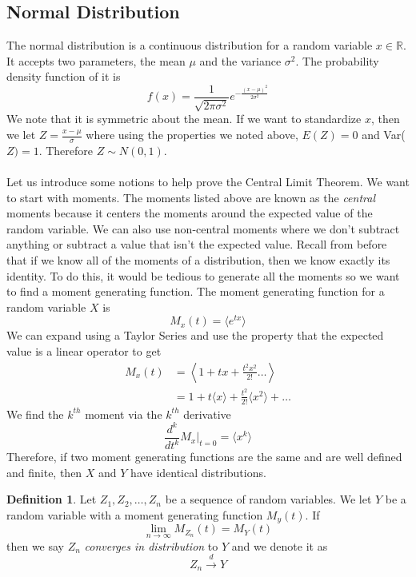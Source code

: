 \documentclass{article}
\theoremstyle{definition}
\newtheorem{definition}[theorem]{Definition}
\begin{document}
\subsection{Normal Distribution}
The normal distribution is a continuous distribution for a random variable $x\in \mathbb{R}$. It accepts two parameters, the mean $\mu$ and the variance $\sigma^2$. The probability density function of it is 
\begin{equation*}
    f(x) = \frac{1}{\sqrt{2\pi \sigma^2}} e^{-\frac{(x-\mu)^2}{2\sigma^2}}
\end{equation*}
We note that it is symmetric about the mean. If we want to standardize $x$, then we let $Z= \frac{x-\mu}{\sigma}$ where using the properties we noted above,  $E(Z) = 0$ and Var($Z)=1$. Therefore $Z \sim N(0,1)$. \\\\Let us introduce some notions to help prove the Central Limit Theorem. We want to start with moments. The moments listed above are known as the \emph{central} moments because it centers the moments around the expected value of the random variable. We can also use non-central moments where we don't subtract anything or subtract a value that isn't the expected value. Recall from before that if we know all of the moments of a distribution, then we know exactly its identity. To do this, it would be tedious to generate all the moments so we want to find a moment generating function. The moment generating function for a random variable $X$ is 
\begin{equation*}
    M_x(t) = \langle e^{tx}\rangle
\end{equation*}
We can expand using a Taylor Series and use the property that the expected value is a linear operator to get
\begin{equation*}
    \begin{split}
        M_x(t)& =\left \langle 1+tx+\frac{t^2x^2}{2!} \ldots \right\rangle \\
        &= 1 + t\langle x\rangle + \frac{t^2}{2!} \langle x^2 \rangle + \ldots
    \end{split}
\end{equation*}
We find the $k^{th}$ moment via the $k^{th}$ derivative
\begin{equation*}
    \frac{d^k}{dt^k}M_x \Bigg|_{t=0} = \langle x^k\rangle
\end{equation*}
Therefore, if two moment generating functions are the same and are well defined and finite, then $X$ and $Y$ have identical distributions. 
\begin{definition}
    Let $Z_1,Z_2,\ldots,Z_n$ be a sequence of random variables. We let $Y$ be a random variable with a moment generating function $M_y(t)$. If 
    \begin{equation*}
        \lim_{n\rightarrow \infty} M_{Z_n} (t) = M_Y(t)
    \end{equation*}
    then we say $Z_n$ \emph{converges in distribution} to $Y$ and we denote it as 
    \begin{equation*}
        Z_n \overset{d}{\longrightarrow}Y
    \end{equation*}
\end{definition}
\end{document}
